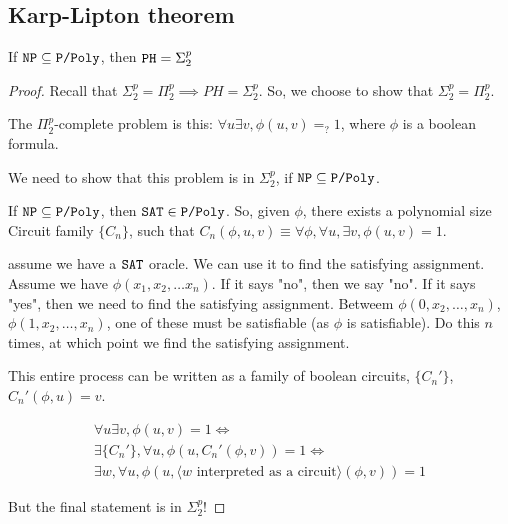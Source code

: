 \subsection{Karp-Lipton theorem}
\begin{theorem}
If $\texttt{NP} \subseteq \texttt{P/Poly}$, then $\texttt{PH} = \Sigma^p_2$
\end{theorem}
\begin{proof}
    Recall that $\Sigma^p_2 = \Pi^p_2 \implies PH = \Sigma^p_2$. So, we
    choose to show that $\Sigma^p_2 = \Pi^p_2$.

    The $\Pi^p_2$-complete problem is this: $\forall u \exists v, \phi(u, v) =_? 1$,
    where $\phi$ is a boolean formula.

    We need to show that this problem is in $\Sigma_2^p$, if $\texttt{NP} \subseteq \texttt{P/Poly}$.

    If $\texttt{NP} \subseteq \texttt{P/Poly}$, then $\texttt{SAT} \in \texttt{P/Poly}$. So, given
    $\phi$, there exists a polynomial size Circuit family $\{ C_n \}$, 
    such that $C_n (\phi, u, v) \equiv \forall \phi, \forall u, \exists v, \phi(u, v) = 1$.

    assume we have a $\texttt{SAT}$ oracle. We can use it to find the satisfying assignment.
    Assume we have $\phi(x_1, x_2, \dots x_n)$. If it says "no", then we say "no".
    If it says "yes", then we need to find the satisfying assignment.
    Betweem $\phi(0, x_2, \dots, x_n)$, $\phi(1, x_2, \dots, x_n)$, one of
    these must be satisfiable (as $\phi$ is satisfiable). Do this $n$
    times, at which point we find the satisfying assignment.

    This entire process can be written as a family of boolean circuits,
    $\{ C_n' \}$, $C_n' (\phi, u) = v$.

    \begin{align*}
        \forall u \exists v, \phi(u, v) = 1 \iff \\
        \exists \{ C_n' \}, \forall u, \phi(u, C_n'(\phi, v)) = 1 \iff \\
        \exists w, \forall u, \phi(u, \langle \text{$w$ interpreted as a circuit} \rangle(\phi, v)) = 1 
\end{align*}

But the final statement is in $\Sigma^p_2$!
\end{proof}
